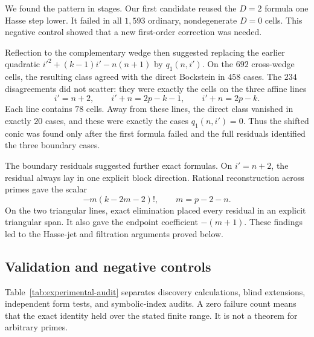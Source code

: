 We found the pattern in stages.  Our first candidate reused the $D=2$
formula one Hasse step lower.  It failed in all $1{,}593$ ordinary,
nondegenerate $D=0$ cells.  This negative control showed that a new
first-order correction was needed.

Reflection to the complementary wedge then suggested replacing the earlier
quadratic $i'^2+(k-1)i'-n(n+1)$ by $q_1(n,i')$.  On the $692$ cross-wedge
cells, the resulting class agreed with the direct Bockstein in $458$ cases.
The $234$ disagreements did not scatter: they were exactly the cells on
the three affine lines
\[
 i'=n+2,
 \qquad i'+n=2p-k-1,
 \qquad i'+n=2p-k.
\]
Each line contains $78$ cells.  Away from these lines, the direct class
vanished in exactly $20$ cases, and these were exactly the cases
$q_1(n,i')=0$.  Thus the shifted conic was found only after the first
formula failed and the full residuals identified the three boundary cases.

The boundary residuals suggested further exact formulas.  On $i'=n+2$, the
residual always lay in one explicit block direction.  Rational reconstruction
across primes gave the scalar
\[
 -m(k-2m-2)!,\qquad m=p-2-n.
\]
On the two triangular lines, exact elimination placed every residual in an
explicit triangular span.  It also gave the endpoint coefficient $-(m+1)$.
These findings led to the Hasse-jet and filtration arguments proved below.



\subsection{Validation and negative controls}

Table~\ref{tab:experimental-audit} separates discovery calculations, blind
extensions, independent form tests, and symbolic-index audits.  A zero
failure count means that the exact identity held over the stated finite
range.  It is not a theorem for arbitrary primes.

